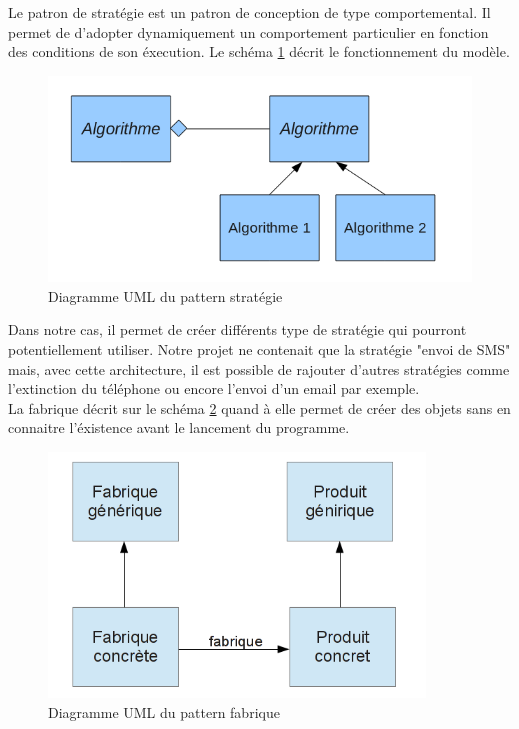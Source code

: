 Le patron de stratégie est un patron de conception de type comportemental. Il permet de d'adopter 
dynamiquement un comportement particulier en fonction des conditions de son éxecution. Le schéma 
\ref{pattern-strategie} décrit le fonctionnement du modèle.

\begin{figure}[H]
	\center
	\includegraphics[width=12cm]{img/pattern-strategie.png}
	\caption{Diagramme UML du pattern stratégie}
	\label{pattern-strategie}
\end{figure}

Dans notre cas, il permet de créer différents type de stratégie qui pourront potentiellement utiliser. 
Notre projet ne contenait que la stratégie "envoi de SMS" mais, avec cette architecture, il est possible 
de rajouter d'autres stratégies comme l'extinction du téléphone ou encore l'envoi d'un email par exemple.
\\


La fabrique décrit sur le schéma \ref{fabrique} quand à elle permet de créer des objets sans en connaitre l'éxistence avant le lancement du 
programme.

\begin{figure}[H]
	\center
	\includegraphics[width=10cm]{img/fabrique.png}
	\caption{Diagramme UML du pattern fabrique}
	\label{fabrique}
\end{figure}

